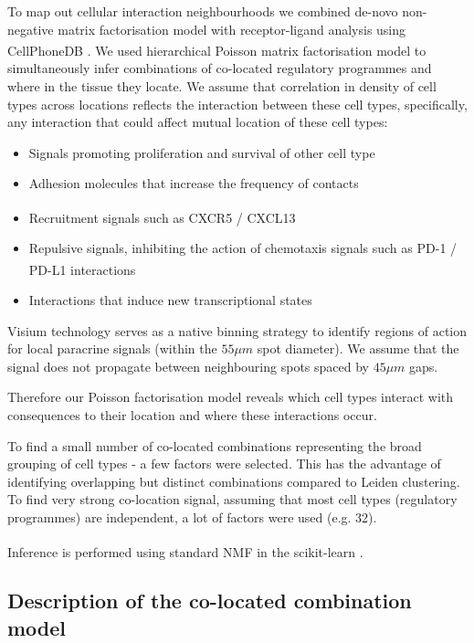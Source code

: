 \documentclass[11pt,a4paper]{article}
\begin{document}
To map out cellular interaction neighbourhoods we combined de-novo non-negative matrix factorisation model with receptor-ligand analysis using CellPhoneDB \textsuperscript{\cite{vento-tormo_single-cell_2018}}. We used hierarchical Poisson matrix factorisation model to simultaneously infer combinations of co-located regulatory programmes and where in the tissue they locate. We assume that correlation in density of cell types across locations reflects the interaction between these cell types, specifically, any interaction that could affect mutual location of these cell types:
\begin{itemize}
    \item Signals promoting proliferation and survival of other cell type
    \item Adhesion molecules that increase the frequency of contacts 
    \item Recruitment signals such as CXCR5 / CXCL13 \textsuperscript{\cite{van_de_pavert_chemokine_2009}}
    \item Repulsive signals, inhibiting the action of chemotaxis signals such as PD-1 / PD-L1 interactions \textsuperscript{\cite{shi_pd-1_2018}}
    \item Interactions that induce new transcriptional states 
\end{itemize}

Visium technology serves as a native binning strategy to identify regions of action for local paracrine signals (within the $55\mu m$ spot diameter). We assume that the signal does not propagate between neighbouring spots spaced by $45\mu m$ gaps.

Therefore our Poisson factorisation model reveals which cell types interact with consequences to their location and where these interactions occur. 

To find a small number of co-located combinations representing the broad grouping of cell types - a few factors were selected. This has the advantage of identifying overlapping but distinct combinations compared to Leiden clustering.
To find very strong co-location signal, assuming that most cell types (regulatory programmes) are independent, a lot of factors were used (e.g. 32).

Inference is performed using standard NMF in the scikit-learn \textsuperscript{\cite{scikit-learn}}.

\subsection{Description of the co-located combination model} \label{cell_neighbourhoods_model}
\end{document}
